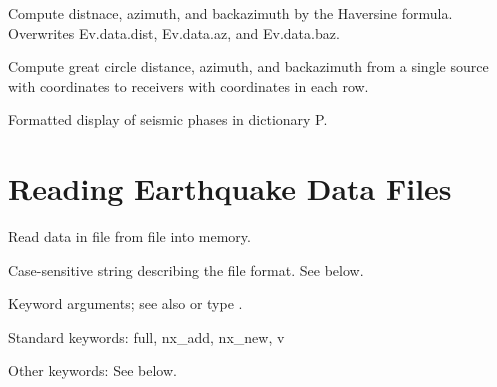 \documentclass[letterpaper,11pt,english]{sphinxmanual}
\begin{document}
Compute distnace, azimuth, and backazimuth by the Haversine formula.
Overwrites Ev.data.dist, Ev.data.az, and Ev.data.baz.

\begin{fulllineitems}
\label{\detokenize{src/Submodules/quake:gcdist}}
\end{fulllineitems}


Compute great circle distance, azimuth, and backazimuth from a single source
with coordinates  to receivers  with coordinates
 in each row.

\begin{fulllineitems}
\label{\detokenize{src/Submodules/quake:show_phases}}
\end{fulllineitems}


Formatted display of seismic phases in dictionary P.


\section{Reading Earthquake Data Files}
\label{\detokenize{src/Submodules/quake:reading-earthquake-data-files}}

\begin{fulllineitems}
\end{fulllineitems}


\begin{DUlineblock}{0em}
\item[] Read data in file  from file  into memory.
\item[] 
\item[] 
\item[] Case-sensitive string describing the file format. See below.
\item[] 
\item[] 
\item[] Keyword arguments; see also {\hyperref[\detokenize{src/Appendices/keywords:dkw}]{}} or type .
\item[] Standard keywords: full, nx\_add, nx\_new, v
\item[] Other keywords: See below.
\end{DUlineblock}
\end{document}
